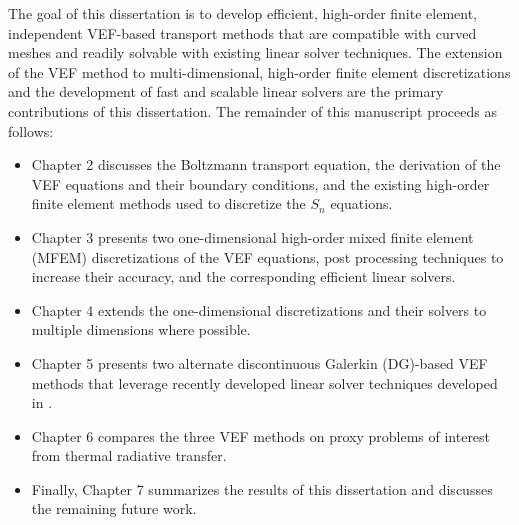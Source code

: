 \documentclass[doc.tex]{subfiles}
\begin{document}
The goal of this dissertation is to develop efficient, high-order finite element, independent VEF-based transport methods that are compatible with curved meshes and readily solvable with existing linear solver techniques. The extension of the VEF method to multi-dimensional, high-order finite element discretizations and the development of fast and scalable linear solvers are the primary contributions of this dissertation. The remainder of this manuscript proceeds as follows: 
	\begin{itemize}
		\item Chapter 2 discusses the Boltzmann transport equation, the derivation of the VEF equations and their boundary conditions, and the existing high-order finite element methods used to discretize the $S_n$ equations. 
		\item Chapter 3 presents two one-dimensional high-order mixed finite element (MFEM) discretizations of the VEF equations, post processing techniques to increase their accuracy, and the corresponding efficient linear solvers. 
		\item Chapter 4 extends the one-dimensional discretizations and their solvers to multiple dimensions where possible.
		\item Chapter 5 presents two alternate discontinuous Galerkin (DG)-based VEF methods that leverage recently developed linear solver techniques developed in \cite{pazner_usc}. 
		\item Chapter 6 compares the three VEF methods on proxy problems of interest from thermal radiative transfer.
		\item Finally, Chapter 7 summarizes the results of this dissertation and discusses the remaining future work. 
	\end{itemize}

\end{document}
